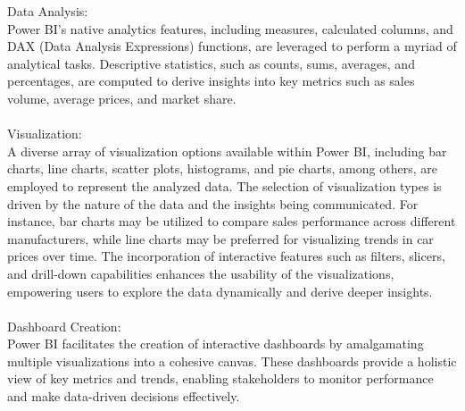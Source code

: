 \documentclass{article}
\begin{document}
{Data Analysis:
\\
Power BI's native analytics features, including measures, calculated columns, and DAX (Data Analysis Expressions) functions, are leveraged to perform a myriad of analytical tasks. Descriptive statistics, such as counts, sums, averages, and percentages, are computed to derive insights into key metrics such as sales volume, average prices, and market share.
\\
\\
Visualization:
\\
A diverse array of visualization options available within Power BI, including bar charts, line charts, scatter plots, histograms, and pie charts, among others, are employed to represent the analyzed data. The selection of visualization types is driven by the nature of the data and the insights being communicated. For instance, bar charts may be utilized to compare sales performance across different manufacturers, while line charts may be preferred for visualizing trends in car prices over time.
The incorporation of interactive features such as filters, slicers, and drill-down capabilities enhances the usability of the visualizations, empowering users to explore the data dynamically and derive deeper insights.
\\
\\
Dashboard Creation:
\\
Power BI facilitates the creation of interactive dashboards by amalgamating multiple visualizations into a cohesive canvas. These dashboards provide a holistic view of key metrics and trends, enabling stakeholders to monitor performance and make data-driven decisions effectively.
}




\newpage
\end{document}
